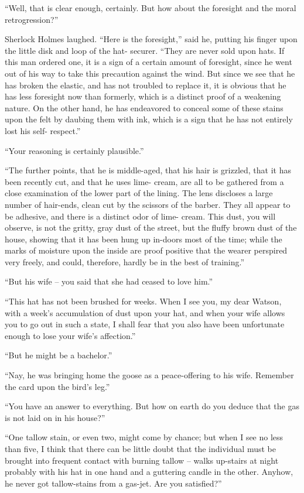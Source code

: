 “Well, that is clear enough, certainly. But how about the
foresight and the moral retrogression?”

Sherlock Holmes laughed. “Here is the foresight,” said
he, putting his finger upon the little disk and loop of the hat-%
securer. “They are never sold upon hats. If this man ordered
one, it is a sign of a certain amount of foresight, since
he went out of his way to take this precaution against the
wind. But since we see that he has broken the elastic, and
has not troubled to replace it, it is obvious that he has less
foresight now than formerly, which is a distinct proof of a
weakening nature. On the other hand, he has endeavored to
conceal some of these stains upon the felt by daubing them
with ink, which is a sign that he has not entirely lost his self-%
respect.”

“Your reasoning is certainly plausible.”

“The further points, that he is middle-aged, that his hair is
grizzled, that it has been recently cut, and that he uses lime-%
cream, are all to be gathered from a close examination of the
lower part of the lining. The lens discloses a large number
of hair-ends, clean cut by the scissors of the barber. They
all appear to be adhesive, and there is a distinct odor of lime-%
cream. This dust, you will observe, is not the gritty, gray
dust of the street, but the fluffy brown dust of the house,
showing that it has been hung up in-doors most of the time;
while the marks of moisture upon the inside are proof positive
that the wearer perspired very freely, and could, therefore,
hardly be in the best of training.”

“But his wife -- you said that she had ceased to love
him.”

“This hat has not been brushed for weeks. When I see
you, my dear Watson, with a week’s accumulation of dust
upon your hat, and when your wife allows you to go out in
such a state, I shall fear that you also have been unfortunate
enough to lose your wife’s affection.”

“But he might be a bachelor.”

“Nay, he was bringing home the goose as a peace-offer\-ing
to his wife. Remember the card upon the bird’s leg.”

“You have an answer to everything. But how on earth do
you deduce that the gas is not laid on in his house?”

“One tallow stain, or even two, might come by chance;
but when I see no less than five, I think that there can be
little doubt that the individual must be brought into frequent
contact with burning tallow -- walks up-stairs at night probably
with his hat in one hand and a guttering candle in the other.
Anyhow, he never got tallow-stains from a gas-jet. Are you
satisfied?”

